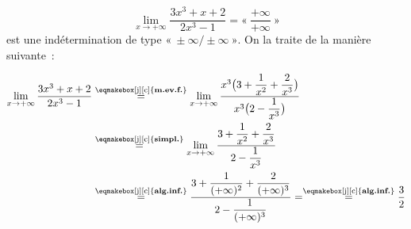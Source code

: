 \documentclass[a4paper,12pt]{article}
\begin{document}
\begin{exemple}
\tcblower
\[\lim_{x\to+\infty}\dfrac{3x^3 + x + 2}{2x^3 - 1}
=«~\dfrac{+\infty}{+\infty}~»\] 
est une indétermination de type $«~\pm\infty/\pm\infty~»$. On la traite de la manière suivante~:

$
\begin{aligned}
	\displaystyle{\lim_{x\to+\infty}\dfrac{3x^3 + x + 2}{2x^3 - 1}}
&\stackrel{\text{\eqmakebox[j][c]{{\bfseries m.ev.f.}}}}{=}
\displaystyle{\lim_{x\to+\infty}\dfrac{x^3\bigl(3 + \dfrac{1}{x^2} + \dfrac{2}{x^3}\bigr)}{x^3\bigl(2 - \dfrac{1}{x^3}\bigr)}}\\
&\stackrel{\text{\eqmakebox[j][c]{{\bfseries simpl.}}}}{=}
\displaystyle{\lim_{x\to+\infty}\dfrac{3 + \dfrac{1}{x^2} + \dfrac{2}{x^3}}{2 - \dfrac{1}{x^3}}}\\
&\stackrel{\text{\eqmakebox[j][c]{{\bfseries alg.inf.}}}}{=}
\displaystyle{\dfrac{3 + \dfrac{1}{(+\infty)^2} + \dfrac{2}{(+\infty)^3}}{2 - \dfrac{1}{(+\infty)^3}}}=\stackrel{\text{\eqmakebox[j][c]{{\bfseries alg.inf.}}}}{=}\dfrac{3}{2}
\end{aligned}
$
\end{exemple}
\end{document}
